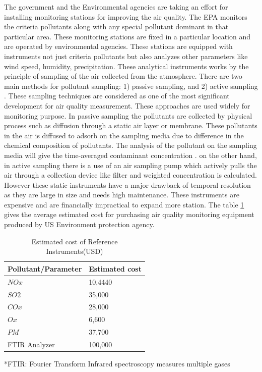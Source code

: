The government and the Environmental agencies are taking an effort for installing monitoring stations for improving the air quality. The EPA monitors the criteria pollutants along with any special pollutant dominant in that particular area. These monitoring stations are fixed in a particular location and are operated by environmental agencies. These stations are equipped with instruments not just criteria pollutants but also analyzes other parameters like wind speed, humidity, precipitation. These analytical instruments works by the principle of sampling of the air collected from the atmosphere.
There are two main methods for pollutant sampling: 1) passive sampling, and 2) active sampling \cite{Balakrishnan2015} \cite{activepassive}. These sampling techniques are considered as one of the most significant development for air quality measurement. These approaches are used widely for monitoring purpose. In passive sampling the pollutants are collected by physical process such as diffusion through a static air layer or membrane. These pollutants in the air is diffused to adsorb on the sampling media due to difference in the chemical composition of pollutants. The analysis of the pollutant on the sampling media will give the time-averaged contaminant concentration \cite{Environment2009}. on the other hand, in active sampling there is a use of an air sampling pump which actively pulls the air through a collection device like filter  and weighted concentration is calculated. However these static instruments have a major drawback of temporal resolution as they are large in size and needs high maintenance. These instruments are expensive and are financially impractical to expand more station. The table \ref{table:cost} gives the average estimated cost for purchasing air quality monitoring equipment produced by US Environment protection agency. 

\begin{table}[h]
  
  
    \begin{tabularx}{\columnwidth}{X|X}
        \hline
        Pollutant/Parameter           & Estimated cost    \\
        \hline
    
      $NOx$   & 10,4440  \\ 
      $SO2$   & 35,000  \\ 
      $COx$   & 28,000  \\ 
      $Ox$   & 6,600  \\ 
      $PM$   & 37,700  \\ 
     
      FTIR Analyzer   & 100,000 \\ \hline
     
        
      
  \end{tabularx}
  *FTIR: Fourier Transform Infrared spectroscopy measures multiple gases 
    \caption{Estimated cost of Reference Instruments(USD) \cite{Mussatti2000} }
    \label{table:cost}
  \end{table}


